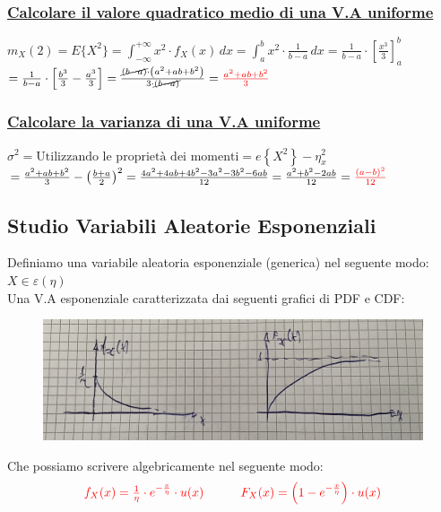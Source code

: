 \documentclass{article}
\begin{document}
\subsubsection{\underline{Calcolare il valore quadratico medio di una V.A uniforme}}
$m_X(2) = E \big\{ X^2 \big\} = \int_{-\infty}^{+\infty} x^2 \cdot f_X(x) \,dx = \int_{a}^{b} x^2 \cdot \frac{1}{b-a} \,dx = \frac{1}{b-a} \cdot \left[\frac{x^3}{3}\right]_a^b$ \\ 
$= \frac{1}{b-a} \cdot \left[\frac{b^3}{3} - \frac{a^3}{3}\right] = \frac{\cancel{(b-a)} \cdot \left( a^2 + ab + b^2 \right) }{ 3 \cdot \cancel{(b-a)}} = \color{red}\frac{a^2 + ab + b^2}{3}$
\subsubsection{\underline{Calcolare la varianza di una V.A uniforme}}
$\sigma^2 = \text{Utilizzando le proprietà dei momenti} = e \left\{ X^2 \right\} - \eta_x^2$ \\
$= \frac{a^2 + ab + b^2}{3} - \left( \frac{b+a}{2} \right)^2 = \frac{4a^2 + 4ab + 4b^2 - 3a^2 - 3b^2 - 6ab}{12} = \frac{a^2+b^2-2ab}{12} = \color{red} \frac{(a-b)^2}{12}$

\subsection{Studio Variabili Aleatorie Esponenziali}
Definiamo una variabile aleatoria esponenziale (generica) nel seguente modo: $X \in \varepsilon \left( \eta \right)$ \\
Una V.A esponenziale caratterizzata dai seguenti grafici di PDF e CDF: 
\begin{figure}[ht]
\centering
\includegraphics[scale=0.12]{images/61.V.A.Exp.jpeg}
\end{figure}
Che possiamo scrivere algebricamente nel seguente modo:
\[\color{red}
\begin{matrix}
f_X(x) = \frac 1 \eta \cdot e^{-\frac x \eta} \cdot u(x)
&&&
F_X(x) = \left( 1 - e^{- \frac x \eta } \right) \cdot u(x)
\end{matrix}\]
\end{document}
